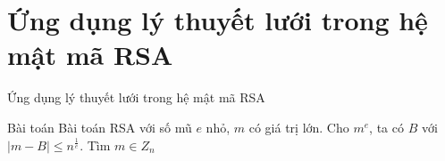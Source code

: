 \documentclass{beamer}
\begin{document}

\section{Ứng dụng lý thuyết lưới trong hệ mật mã RSA}
\begin{frame}{Ứng dụng lý thuyết lưới trong hệ mật mã RSA}
\begin{block}{Bài toán}
Bài toán RSA với số mũ $e$ nhỏ, $m$ có giá trị lớn. Cho $m^e$, ta có $B$ với $|m-B| \leq n^{\tfrac{1}{e}}$. Tìm $m \in Z_n$
\end{block}

\end{frame}
\end{document}
